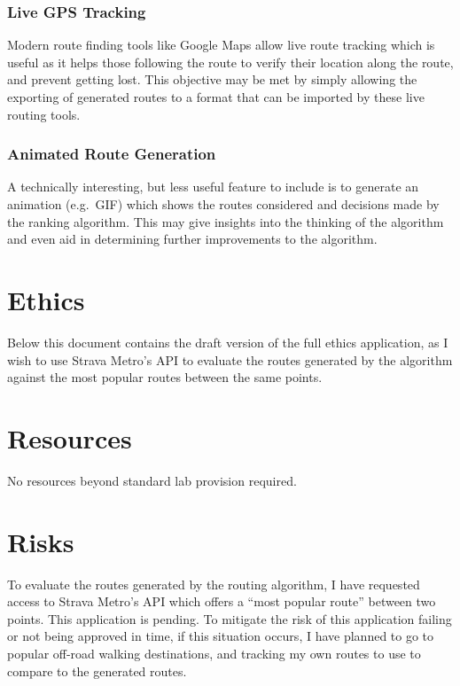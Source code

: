 \hypertarget{live-gps-tracking}{%
\subsubsection{Live GPS Tracking}\label{live-gps-tracking}}

Modern route finding tools like Google Maps allow live route tracking
which is useful as it helps those following the route to verify their
location along the route, and prevent getting lost. This objective may
be met by simply allowing the exporting of generated routes to a format
that can be imported by these live routing tools.

\hypertarget{animated-route-generation}{%
\subsubsection{Animated Route
Generation}\label{animated-route-generation}}

A technically interesting, but less useful feature to include is to
generate an animation (e.g.~GIF) which shows the routes considered and
decisions made by the ranking algorithm. This may give insights into the
thinking of the algorithm and even aid in determining further
improvements to the algorithm.

\hypertarget{ethics}{%
\section{Ethics}\label{ethics}}

Below this document contains the draft version of the full ethics
application, as I wish to use Strava Metro's API to evaluate the routes
generated by the algorithm against the most popular routes between the
same points.

\hypertarget{resources}{%
\section{Resources}\label{resources}}

No resources beyond standard lab provision required.

\hypertarget{risks}{%
\section{Risks}\label{risks}}

To evaluate the routes generated by the routing algorithm, I have
requested access to Strava Metro's API which offers a ``most popular
route'' between two points. This application is pending. To mitigate the
risk of this application failing or not being approved in time, if this
situation occurs, I have planned to go to popular off-road walking
destinations, and tracking my own routes to use to compare to the
generated routes.
